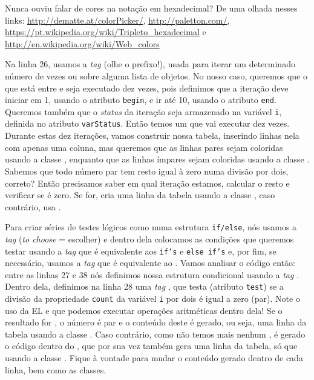 \begin{saibaMais}
    Nunca ouviu falar de cores na notação em hexadecimal? De uma olhada nesses links: \url{http://dematte.at/colorPicker/}, \url{http://paletton.com/}, \url{https://pt.wikipedia.org/wiki/Tripleto_hexadecimal} e \url{http://en.wikipedia.org/wiki/Web_colors}
\end{saibaMais}

Na linha 26, usamos a \textit{tag}  (olhe o prefixo!), usada para iterar um determinado número de vezes ou sobre alguma lista de objetos. No nosso caso, queremos que o que está entre  e  seja executado dez vezes, pois definimos que a iteração deve iniciar em 1, usando o atributo \texttt{begin}, e ir até 10, usando o atributo \texttt{end}. Queremos também que o \textit{status} da iteração seja armazenado na variável \texttt{i}, definida no atributo \texttt{varStatus}. Então temos um  que vai executar dez vezes. Durante estas dez iterações, vamos construir nossa tabela, inserindo linhas nela com apenas uma coluna, mas queremos que as linhas pares sejam coloridas usando a classe , enquanto que as linhas ímpares sejam coloridas usando a classe . Sabemos que todo número par tem resto igual à zero numa divisão por dois, correto? Então precisamos saber em qual iteração estamos, calcular o resto e verificar se é zero. Se for, cria uma linha da tabela usando a classe , caso contrário, usa .

Para criar séries de testes lógicos como numa estrutura \texttt{if/else}, nós usamos a \textit{tag}  (\textit{to choose} = escolher) e dentro dela colocamos as condições que queremos testar usando a \textit{tag}  que é equivalente aos \texttt{if’s} e \texttt{else if’s} e, por fim, se necessário, usamos a \textit{tag}  que é equivalente ao . Vamos analisar o código então: entre as linhas 27 e 38 nós definimos nossa estrutura condicional usando a \textit{tag} . Dentro dela, definimos na linha 28 uma \textit{tag} , que testa (atributo \texttt{test}) se a divisão da propriedade \texttt{count} da variável \texttt{i} por dois é igual a zero (par). Note o uso da EL e que podemos executar operações aritméticas dentro dela! Se o resultado for , o número é par e o conteúdo deste  é gerado, ou seja, uma linha da tabela usando a classe . Caso contrário, como não temos mais nenhum , é gerado o código dentro do , que por sua vez também gera uma linha da tabela, só que usando a classe . Fique à vontade para mudar o conteúdo gerado dentro de cada linha, bem como as classes.

